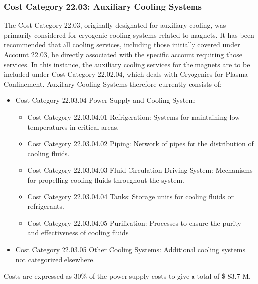 \subsubsection{Cost Category 22.03: Auxiliary Cooling Systems}

The Cost Category 22.03, originally designated for auxiliary cooling, was primarily considered for cryogenic cooling systems related to magnets. It has been recommended that all cooling services, including those initially covered under Account 22.03, be directly associated with the specific account requiring those services. In this instance, the auxiliary cooling services for the magnets are to be included under Cost Category 22.02.04, which deals with Cryogenics for Plasma Confinement. Auxiliary Cooling Systems therefore currently consists of:

\begin{itemize}
    \item Cost Category 22.03.04 Power Supply and Cooling System: 
    \begin{itemize}
        \item Cost Category 22.03.04.01 Refrigeration: Systems for maintaining low temperatures in critical areas.
        \item Cost Category 22.03.04.02 Piping: Network of pipes for the distribution of cooling fluids.
        \item Cost Category 22.03.04.03 Fluid Circulation Driving System: Mechanisms for propelling cooling fluids throughout the system.
        \item Cost Category 22.03.04.04 Tanks: Storage units for cooling fluids or refrigerants.
        \item Cost Category 22.03.04.05 Purification: Processes to ensure the purity and effectiveness of cooling fluids.
    \end{itemize}
    \item Cost Category 22.03.05 Other Cooling Systems: Additional cooling systems not categorized elsewhere.
\end{itemize}

Costs are expressed as 30\% of the power supply costs to give a total of \$ 83.7 M.